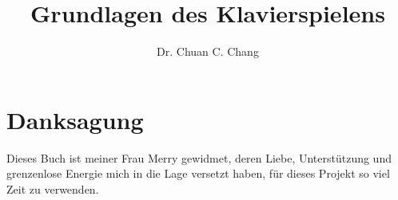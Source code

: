 \documentclass[a4paper]{book}
\title{Grundlagen des Klavierspielens}
\author{Dr. Chuan C. Chang}
\begin{document}
\maketitle

\chapter*{Danksagung}
Dieses Buch ist meiner Frau Merry gewidmet, deren Liebe, Unterstützung und grenzenlose Energie mich in die Lage versetzt haben, für dieses Projekt so viel Zeit zu verwenden.

\tableofcontents






























































\appendix

%

\end{document}
